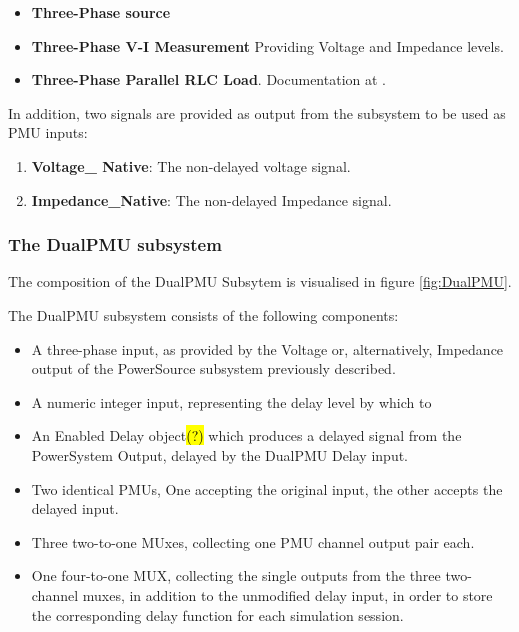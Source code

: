 \begin{itemize}
    \item \textbf{Three-Phase source} 
    \item \textbf{Three-Phase V-I Measurement}  Providing Voltage and Impedance levels.
    \item \textbf{Three-Phase Parallel RLC Load}. Documentation at \cite{mathworksImplementThreephase}. 
\end{itemize}
In addition, two signals are provided as output from the subsystem to be used as PMU inputs:
\begin{enumerate}
    \item \textbf{Voltage\_ Native}: The non-delayed voltage signal.
    \item \textbf{Impedance\_Native}: The non-delayed Impedance signal.
\end{enumerate}

\subsubsection{The DualPMU subsystem}
The composition of the DualPMU Subsytem is visualised in figure \ref{fig:DualPMU}.

The DualPMU subsystem consists of the following components:
\begin{itemize}
    \item A three-phase input, as provided by the Voltage or, alternatively, Impedance output of the PowerSource subsystem previously described.
    \item A numeric integer input, representing the delay level by which to 
    \item An Enabled Delay object\hl{(?)} which produces a delayed signal from the PowerSystem Output, delayed by the DualPMU Delay input.
    \item Two identical PMUs, One accepting the original input, the other accepts the delayed input.
    \item Three two-to-one MUxes, collecting one PMU channel output pair each.
    \item One four-to-one  MUX, collecting the single outputs from the three two-channel muxes, in addition to the unmodified delay input, in order to store the corresponding delay function for each simulation session.
\end{itemize}




